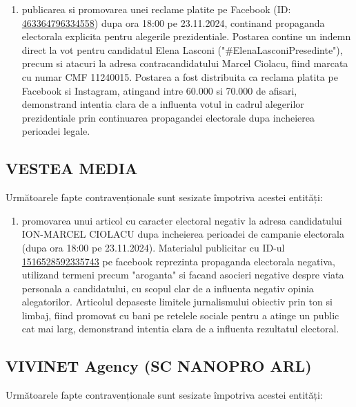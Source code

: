 \documentclass[a4paper,12pt]{article}
\begin{document}
\begin{enumerate}[leftmargin=*, label=\arabic*.)]
    \item publicarea si promovarea unei reclame platite pe Facebook (ID: \href{https://www.facebook.com/ads/library/?id=463364796334558}{463364796334558}) dupa ora 18:00 pe 23.11.2024, continand propaganda electorala explicita pentru alegerile prezidentiale. Postarea contine un indemn direct la vot pentru candidatul Elena Lasconi ("\#ElenaLasconiPresedinte"), precum si atacuri la adresa contracandidatului Marcel Ciolacu, fiind marcata cu numar CMF 11240015. Postarea a fost distribuita ca reclama platita pe Facebook si Instagram, atingand intre 60.000 si 70.000 de afisari, demonstrand intentia clara de a influenta votul in cadrul alegerilor prezidentiale prin continuarea propagandei electorale dupa incheierea perioadei legale.
\end{enumerate}

\vspace{0.5cm}

\subsection{VESTEA MEDIA}
Următoarele fapte contravenționale sunt sesizate împotriva acestei entități:

\begin{enumerate}[leftmargin=*, label=\arabic*.)]
    \item promovarea unui articol cu caracter electoral negativ la adresa candidatului ION-MARCEL CIOLACU dupa incheierea perioadei de campanie electorala (dupa ora 18:00 pe 23.11.2024). Materialul publicitar cu ID-ul \href{https://www.facebook.com/ads/library/?id=1516528592335743}{1516528592335743} pe facebook reprezinta propaganda electorala negativa, utilizand termeni precum "aroganta" si facand asocieri negative despre viata personala a candidatului, cu scopul clar de a influenta negativ opinia alegatorilor. Articolul depaseste limitele jurnalismului obiectiv prin ton si limbaj, fiind promovat cu bani pe retelele sociale pentru a atinge un public cat mai larg, demonstrand intentia clara de a influenta rezultatul electoral.
\end{enumerate}

\vspace{0.5cm}

\subsection{VIVINET Agency (SC NANOPRO ARL)}
Următoarele fapte contravenționale sunt sesizate împotriva acestei entități:
\end{document}
